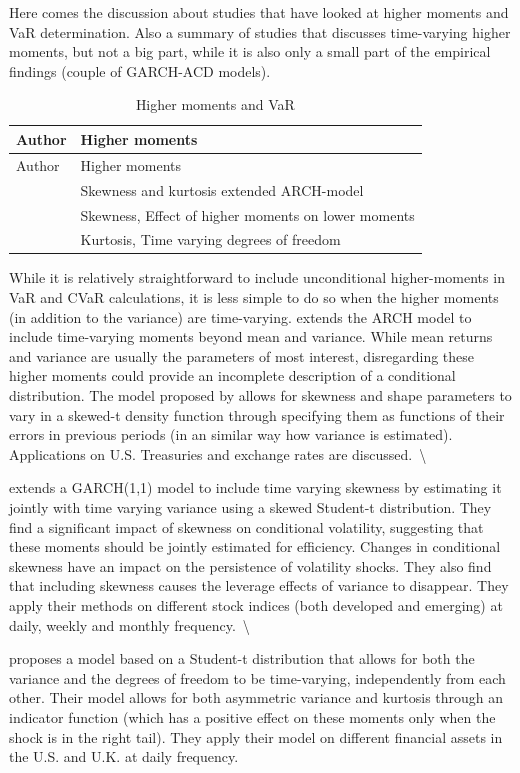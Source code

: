 \documentclass[a4paper, nobind]{templates/ociamthesis}
\begin{document}
Here comes the discussion about studies that have looked at higher moments and VaR determination. Also a summary of studies that discusses time-varying higher moments, but not a big part, while it is also only a small part of the empirical findings (couple of GARCH-ACD models).

\begin{longtable}[]{@{}ll@{}}
\caption{Higher moments and VaR}\tabularnewline
\toprule
Author & Higher moments\tabularnewline
\midrule
\endfirsthead
\toprule
Author & Higher moments\tabularnewline
\midrule
\endhead
\textcite{hansen1994} & Skewness and kurtosis extended ARCH-model\tabularnewline
\textcite{harvey1999} & Skewness, Effect of higher moments on lower moments\tabularnewline
\textcite{brooks2005} & Kurtosis, Time varying degrees of freedom\tabularnewline
\bottomrule
\end{longtable}

\noindent While it is relatively straightforward to include unconditional higher-moments in VaR and CVaR calculations, it is less simple to do so when the higher moments (in addition to the variance) are time-varying. \textcite{hansen1994} extends the ARCH model to include time-varying moments beyond mean and variance. While mean returns and variance are usually the parameters of most interest, disregarding these higher moments could provide an incomplete description of a conditional distribution. The model proposed by \textcite{hansen1994} allows for skewness and shape parameters to vary in a skewed-t density function through specifying them as functions of their errors in previous periods (in an similar way how variance is estimated). Applications on U.S. Treasuries and exchange rates are discussed.~\textbackslash{}

\noindent \textcite{harvey1999} extends a GARCH(1,1) model to include time varying skewness by estimating it jointly with time varying variance using a skewed Student-t distribution. They find a significant impact of skewness on conditional volatility, suggesting that these moments should be jointly estimated for efficiency. Changes in conditional skewness have an impact on the persistence of volatility shocks. They also find that including skewness causes the leverage effects of variance to disappear. They apply their methods on different stock indices (both developed and emerging) at daily, weekly and monthly frequency.~\textbackslash{}

\noindent \textcite{brooks2005} proposes a model based on a Student-t distribution that allows for both the variance and the degrees of freedom to be time-varying, independently from each other. Their model allows for both asymmetric variance and kurtosis through an indicator function (which has a positive effect on these moments only when the shock is in the right tail). They apply their model on different financial assets in the U.S. and U.K. at daily frequency.
\end{document}
